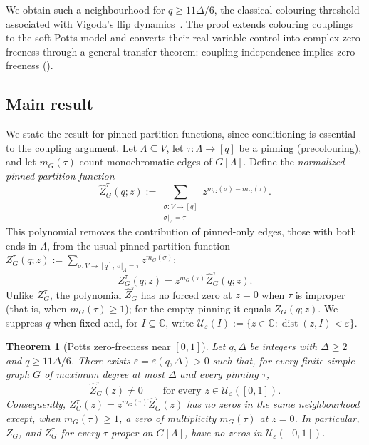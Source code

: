 \documentclass[11pt,reqno]{article}
\theoremstyle{plain}
\newtheorem{theorem}{Theorem}[section]
\theoremstyle{definition}
\theoremstyle{remark}
\theoremstyle{definition}
\theoremstyle{remark}
\newcommand{\C}{\mathbb{C}}
\newcommand{\eps}{\varepsilon}
\newcommand{\dist}{\operatorname{dist}}
\newcommand{\Deg}{\Delta}                        %
\newcommand{\Zpart}{Z}                           %
\newcommand{\colours}{[q]}                        %
\newcommand{\Zpin}[2]{Z_{#1}^{#2}}
\newcommand{\nZpin}[2]{\widehat Z_{#1}^{#2}}
\begin{document}
We obtain such a neighbourhood for \(q\ge11\Deg/6\), the classical
colouring threshold associated with Vigoda's flip
dynamics~\cite{Vigoda2000}.
The proof extends colouring couplings to the soft Potts model and
converts their real-variable control into complex zero-freeness through a
general transfer theorem: coupling independence implies zero-freeness
().

\subsection{Main result}

We state the result for pinned partition functions, since conditioning
is essential to the coupling argument.  Let \(\Lambda\subseteq V\), let
\(\tau\colon\Lambda\to\colours\) be a pinning (precolouring), and let
\(m_G(\tau)\) count monochromatic edges of \(G[\Lambda]\).  Define the
\emph{normalized pinned partition function}
\begin{equation}
  \nZpin{G}{\tau}(q;z)
  :=\sum_{\substack{\sigma\colon V\to\colours\\
                    \sigma|_\Lambda=\tau}}
       z^{m_G(\sigma)-m_G(\tau)}.
  \label{eq:intro-normalized-pinned}
\end{equation}
This polynomial removes the contribution of pinned-only edges, those
with both ends in \(\Lambda\), from the usual pinned partition function
\(\Zpin{G}{\tau}(q;z):=\sum_{\sigma\colon V\to\colours,\
\sigma|_\Lambda=\tau}z^{m_G(\sigma)}\):
\begin{equation}
  \Zpin{G}{\tau}(q;z)
  =z^{m_G(\tau)}\nZpin{G}{\tau}(q;z).
  \label{eq:intro-normalization}
\end{equation}
Unlike \(\Zpin{G}{\tau}\), the polynomial \(\nZpin{G}{\tau}\) has no
forced zero at \(z=0\) when \(\tau\) is improper (that is, when
\(m_G(\tau)\ge1\)); for the empty pinning it equals \(\Zpart_G(q;z)\).
We suppress \(q\) when fixed and, for \(I\subseteq\C\), write
\(\mathcal U_\eps(I):=\{z\in\C:\dist(z,I)<\eps\}\).

\begin{theorem}[Potts zero-freeness near \texorpdfstring{$[0,1]$}{[0,1]}]
\label{thm:intro-main}
Let \(q,\Deg\) be integers with \(\Deg\ge2\) and \(q\ge11\Deg/6\).
There exists \(\eps=\eps(q,\Deg)>0\) such that, for every finite simple
graph \(G\) of maximum degree at most \(\Deg\) and every pinning \(\tau\),
\[
  \nZpin{G}{\tau}(z)\ne0
  \qquad\text{for every }z\in\mathcal U_\eps([0,1]).
\]
Consequently, \(\Zpin{G}{\tau}(z)=z^{m_G(\tau)}\nZpin{G}{\tau}(z)\) has
no zeros in the same neighbourhood except, when \(m_G(\tau)\ge1\), a zero
of multiplicity \(m_G(\tau)\) at \(z=0\).  In particular, \(\Zpart_G\),
and \(\Zpin{G}{\tau}\) for every \(\tau\) proper on \(G[\Lambda]\), have
no zeros in \(\mathcal U_\eps([0,1])\).
\end{theorem}
\end{document}
